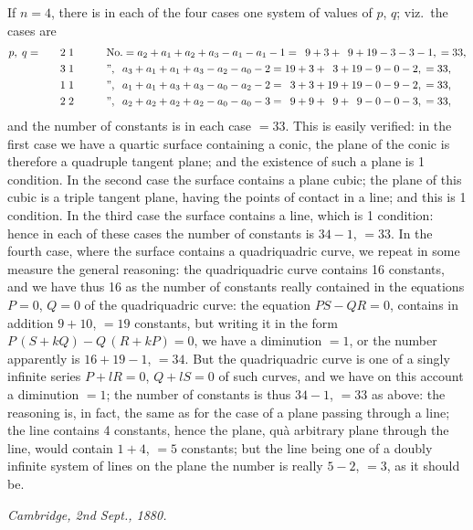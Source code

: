 \documentclass[12pt,a4paper,oneside]{book}
\theoremstyle{plain}
\theoremstyle{definition}
\theoremstyle{remark}
\begin{document}
If $n=4$, there is in each of the four cases one system of values of $p$, $q$; viz.\ the cases are
\begin{alignat*}{3}
&p,\; q = &&\quad 2\; 1 \qquad
&&\mathrm{No.}=a_2+a_1+a_2+a_3-a_1-a_1-1=\phantom{1}9+3+\phantom{1}9+19-3-3-1,\;=33,\\
&          &&\quad 3\; 1 \qquad
&&     ",\;\; a_3+a_1+a_1+a_3-a_2-a_0-2=19+3+\phantom{1}3+19-9-0-2,\;=33,\\
&          &&\quad 1\; 1 \qquad
&&     ",\;\; a_1+a_1+a_3+a_3-a_0-a_2-2=\phantom{1}3+3+19+19-0-9-2,\;=33,\\
&          &&\quad 2\; 2 \qquad
&&     ",\;\; a_2+a_2+a_2+a_2-a_0-a_0-3=\phantom{1}9+9+\phantom{1}9+\phantom{1}9-0-0-3,\;=33,
\end{alignat*}
and the number of constants is in each case $=33$. This is easily verified: in the first case we have a quartic surface containing a conic, the plane of the conic is therefore a quadruple tangent plane; and the existence of such a plane is 1 condition. In the second case the surface contains a plane cubic; the plane of this cubic is a triple tangent plane, having the points of contact in a line; and this is 1 condition. In the third case the surface contains a line, which is 1 condition: hence in each of these cases the number of constants is $34-1$, $=33$. In the fourth case, where the surface contains a quadriquadric curve, we repeat in some measure the general reasoning: the quadriquadric curve contains 16 constants, and we have thus 16 as the number of constants really contained in the equations $P=0$, $Q=0$ of the quadriquadric curve: the equation $PS-QR=0$, contains in addition $9+10$, $=19$ constants, but writing it in the form $P\,(S+kQ)-Q\,(R+kP)=0$, we have a diminution $=1$, or the number apparently is $16+19-1$, $=34$. But the quadriquadric curve is one of a singly infinite series $P+lR=0$, $Q+lS=0$ of such curves, and we have on this account a diminution $=1$; the number of constants is thus $34-1$, $=33$ as above: the reasoning is, in fact, the same as for the case of a plane passing through a line; the line contains 4 constants, hence the plane, qu\`a arbitrary plane through the line, would contain $1+4$, $=5$ constants; but the line being one of a doubly infinite system of lines on the plane the number is really $5-2$, $=3$, as it should be.

\begin{flushright}
\textit{Cambridge, 2nd Sept., 1880.}
\end{flushright}
\end{document}
